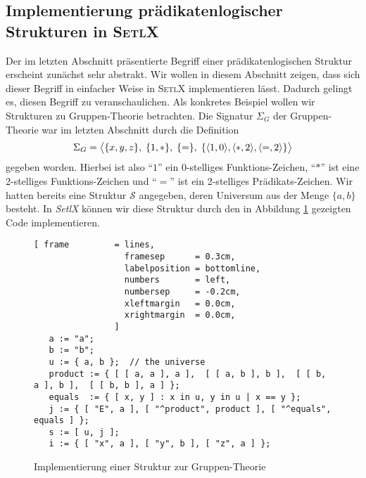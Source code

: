 \subsection{Implementierung pr\"{a}dikatenlogischer Strukturen in \textsc{SetlX}}
Der im letzten Abschnitt pr\"{a}sentierte Begriff einer pr\"{a}dikatenlogischen Struktur erscheint zun\"{a}chst
sehr abstrakt.  Wir wollen in diesem Abschnitt zeigen, dass sich dieser Begriff in einfacher Weise in
\textsc{SetlX} implementieren l\"{a}sst.  Dadurch gelingt es, diesen Begriff zu veranschaulichen.  Als konkretes
Beispiel wollen wir Strukturen zu Gruppen-Theorie betrachten.  Die Signatur $\Sigma_G$ der
Gruppen-Theorie war im letzten Abschnitt durch die Definition
\[ \Sigma_G = 
   \bigl\langle \{x,y,z\},\; \{1,*\},\; \{=\},\; \{ \pair(1,0), \pair(*,2), \pair(=,2) \} \bigr\rangle 
\]
gegeben worden.  Hierbei ist also ``$1$'' ein 0-stelliges Funktions-Zeichen, ``$*$'' ist
eine 2-stelliges Funktions-Zeichen und ``$=$'' ist ein 2-stelliges Pr\"{a}dikats-Zeichen.
Wir hatten bereits eine Struktur $\mathcal{S}$ angegeben, deren Universum aus der Menge
$\{ a, b \}$ besteht.  In \textsl{SetlX} k\"{o}nnen wir diese Struktur durch den in Abbildung
\ref{fig:gruppen.stl} gezeigten Code implementieren.

\begin{figure}[!ht]
\centering
\begin{Verbatim}[ frame         = lines, 
                  framesep      = 0.3cm, 
                  labelposition = bottomline,
                  numbers       = left,
                  numbersep     = -0.2cm,
                  xleftmargin   = 0.0cm,
                  xrightmargin  = 0.0cm,
                ]
   a := "a";
   b := "b"; 
   u := { a, b };  // the universe
   product := { [ [ a, a ], a ],  [ [ a, b ], b ],  [ [ b, a ], b ],  [ [ b, b ], a ] };
   equals  := { [ x, y ] : x in u, y in u | x == y };
   j := { [ "E", a ], [ "^product", product ], [ "^equals", equals ] };
   s := [ u, j ];
   i := { [ "x", a ], [ "y", b ], [ "z", a ] }; 
\end{Verbatim}
\vspace*{-0.3cm}
\caption{Implementierung einer Struktur zur Gruppen-Theorie}
\label{fig:gruppen.stl}
\end{figure}

